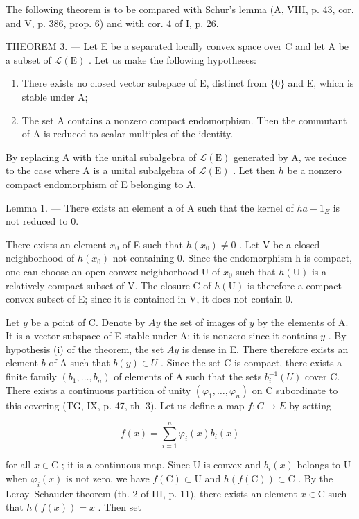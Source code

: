 The following theorem is to be compared with Schur's lemma (A, VIII, p. 43, cor. and V, p. 386, prop. 6) and with cor. 4 of I, p. 26.

THEOREM 3. --- Let E be a separated locally convex space over C and let A be a subset of \(\mathcal{L}(\mathrm{E})\) . Let us make the following hypotheses:

\begin{enumerate}
\def\labelenumi{(\roman{enumi})}
\item
  There exists no closed vector subspace of E, distinct from \(\{0\}\) and E, which is stable under A;
\item
  The set A contains a nonzero compact endomorphism. Then the commutant of A is reduced to scalar multiples of the identity.
\end{enumerate}

By replacing A with the unital subalgebra of \(\mathcal{L}(\mathrm{E})\) generated by A, we reduce to the case where A is a unital subalgebra of \(\mathcal{L}(\mathrm{E})\) . Let then \(h\) be a nonzero compact endomorphism of E belonging to A.

Lemma 1. --- There exists an element a of A such that the kernel of \(ha - 1_{E}\) is not reduced to 0.

There exists an element \(x_{0}\) of E such that \(h(x_{0}) \neq 0\) . Let V be a closed neighborhood of \(h(x_{0})\) not containing 0. Since the endomorphism h is compact, one can choose an open convex neighborhood U of \(x_{0}\) such that \(h(\mathrm{U})\) is a relatively compact subset of V. The closure C of \(h(\mathrm{U})\) is therefore a compact convex subset of E; since it is contained in V, it does not contain 0.

Let \(y\) be a point of C. Denote by \(Ay\) the set of images of \(y\) by the elements of A. It is a vector subspace of E stable under A; it is nonzero since it contains \(y\) . By hypothesis (i) of the theorem, the set \(Ay\) is dense in E. There therefore exists an element \(b\) of A such that \(b(y) \in U\) . Since the set C is compact, there exists a finite family \((b_1, \ldots, b_n)\) of elements of A such that the sets \(b_i^{-1}(U)\) cover C. There exists a continuous partition of unity \((\varphi_1, \ldots, \varphi_n)\) on C subordinate to this covering (TG, IX, p. 47, th. 3). Let us define a map \(f: C \to E\) by setting

\[
f (x) = \sum_ {i = 1} ^ {n} \varphi_ {i} (x) b _ {i} (x)
\]

for all \(x \in \mathrm{C}\) ; it is a continuous map. Since U is convex and \(b_i(x)\) belongs to U when \(\varphi_i(x)\) is not zero, we have \(f(\mathrm{C}) \subset \mathrm{U}\) and \(h(f(\mathrm{C})) \subset \mathrm{C}\) . By the Leray--Schauder theorem (th. 2 of III, p. 11), there exists an element \(x \in \mathrm{C}\) such that \(h(f(x)) = x\) . Then set

